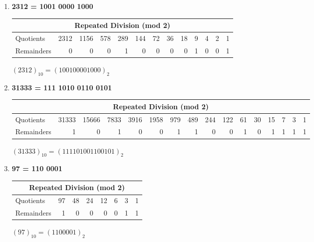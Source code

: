 \documentclass{article}
\begin{document}
\begin{enumerate}
\begin{enumerate}
				\item \textbf{2312 = 1001 0000 1000} \\

					\begin{center}
					\begin{tabular}{lrrrrrrrrrrrr}
						\hline
						\multicolumn{13}{c}{Repeated Division (mod 2)}\\\hline
						Quotients  & 2312 & 1156 & 578 & 289 & 144 & 72 & 36 & 18 & 9 & 4 & 2 & 1\\
						Remainders &    0 &    0 &   0 &   1 &   0 &  0 &  0 &  0 & 1 & 0 & 0 & 1\\\hline		
					\end{tabular}

					$(2312)_{10} = (100100001000)_2$
					\end{center}
				
				\item \textbf{31333 = 111 1010 0110 0101} \\

					\begin{center}
					\begin{tabular}{lrrrrrrrrrrrrrrr}
						\hline
						\multicolumn{16}{c}{Repeated Division (mod 2)}\\\hline
						Quotients  & 31333 & 15666 & 7833 & 3916 & 1958 & 979 & 489 & 244 & 122 & 61 & 30 & 15 & 7 & 3 & 1\\
						Remainders &     1 &     0 &    1 &    0 &    0 &   1 &   1 &   0 &   0 &  1 &  0 &  1 & 1 & 1 & 1\\\hline		
					\end{tabular}

					$(31333)_{10} = (111101001100101)_2$
					\end{center}
				
				\item \textbf{97 = 110 0001} \\

					\begin{center}
					\begin{tabular}{lrrrrrrr}
						\hline
						\multicolumn{8}{c}{Repeated Division (mod 2)}\\\hline
						Quotients  & 97 & 48 & 24 & 12 & 6 & 3 & 1\\
						Remainders &  1 &  0 &  0 &  0 & 0 & 1 & 1\\\hline		
					\end{tabular}

					$(97)_{10} = (1100001)_2$
					\end{center}
			

\end{enumerate}
\end{enumerate}
\end{document}
